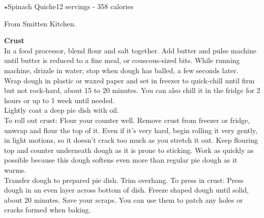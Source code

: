 \begin{recipe}{\texorpdfstring{$\star$}{str}Spinach Quiche}{12 servings - 358 calories}{}

\freeform From Smitten Kitchen.


\textbf{Crust}\\

In a food processor, blend flour and salt together. Add butter and pulse machine until butter is reduced to a fine meal, or couscous-sized bits. While running machine, drizzle in water; stop when dough has balled, a few seconds later.\\

Wrap dough in plastic or waxed paper and set in freezer to quick-chill until firm but not rock-hard, about 15 to 20 minutes. You can also chill it in the fridge for 2 hours or up to 1 week until needed.\\

Lightly coat a deep pie dish with oil.\\

To roll out crust: Flour your counter well. Remove crust from freezer or fridge, unwrap and flour the top of it. Even if it’s very hard, begin rolling it very gently, in light motions, so it doesn't crack too much as you stretch it out. Keep flouring top and counter underneath dough as it is prone to sticking. Work as quickly as possible because this dough softens even more than regular pie dough as it warms.\\

Transfer dough to prepared pie dish. Trim overhang. To press in crust: Press dough in an even layer across bottom of dish. Freeze shaped dough until solid, about 20 minutes. Save your scraps. You can use them to patch any holes or cracks formed when baking.\\


\end{recipe}
